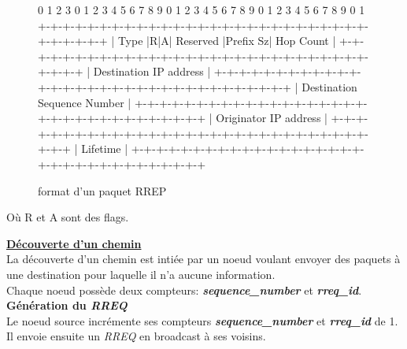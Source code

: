         \begin{figure}[H]
            \centering
                \begin{verbatimtab}
 0                   1                   2                   3
 0 1 2 3 4 5 6 7 8 9 0 1 2 3 4 5 6 7 8 9 0 1 2 3 4 5 6 7 8 9 0 1
+-+-+-+-+-+-+-+-+-+-+-+-+-+-+-+-+-+-+-+-+-+-+-+-+-+-+-+-+-+-+-+-+
|     Type      |R|A|    Reserved     |Prefix Sz|   Hop Count   |
+-+-+-+-+-+-+-+-+-+-+-+-+-+-+-+-+-+-+-+-+-+-+-+-+-+-+-+-+-+-+-+-+
|                     Destination IP address                    |
+-+-+-+-+-+-+-+-+-+-+-+-+-+-+-+-+-+-+-+-+-+-+-+-+-+-+-+-+-+-+-+-+
|                  Destination Sequence Number                  |
+-+-+-+-+-+-+-+-+-+-+-+-+-+-+-+-+-+-+-+-+-+-+-+-+-+-+-+-+-+-+-+-+
|                    Originator IP address                      |
+-+-+-+-+-+-+-+-+-+-+-+-+-+-+-+-+-+-+-+-+-+-+-+-+-+-+-+-+-+-+-+-+
|                           Lifetime                            |
+-+-+-+-+-+-+-+-+-+-+-+-+-+-+-+-+-+-+-+-+-+-+-+-+-+-+-+-+-+-+-+-+
                \end{verbatimtab}
            \caption{format d'un paquet RREP \cite{aodv_w}}
            \label{rreqPaquet}
        \end{figure}
        Où R et A sont des flags.

    \underline{\textbf{Découverte d'un chemin}}\\
        La découverte d'un chemin est intiée par un noeud voulant envoyer des paquets à une destination pour laquelle il n'a aucune information.\\
        Chaque noeud possède deux compteurs: \textbf{\textit{sequence\_number}} et \textbf{\textit{rreq\_id}}.\\
        
        \textbf{Génération du \textit{RREQ}}\\
            Le noeud source incrémente ses compteurs \textbf{\textit{sequence\_number}} et \textbf{\textit{rreq\_id}} de 1.
            Il envoie ensuite un \textit{RREQ} en broadcast à ses voisins.\\
        
